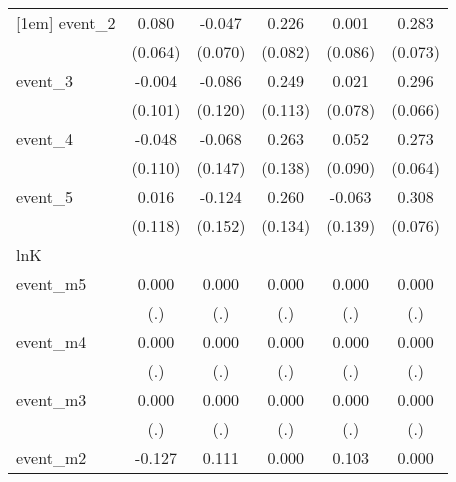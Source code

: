 {\begin{tabular}{l*{5}{c}}
[1em]
event\_2     &       0.080         &      -0.047         &       0.226\sym{**} &       0.001         &       0.283\sym{***}\\
            &     (0.064)         &     (0.070)         &     (0.082)         &     (0.086)         &     (0.073)         \\
[1em]
event\_3     &      -0.004         &      -0.086         &       0.249\sym{*}  &       0.021         &       0.296\sym{***}\\
            &     (0.101)         &     (0.120)         &     (0.113)         &     (0.078)         &     (0.066)         \\
[1em]
event\_4     &      -0.048         &      -0.068         &       0.263         &       0.052         &       0.273\sym{***}\\
            &     (0.110)         &     (0.147)         &     (0.138)         &     (0.090)         &     (0.064)         \\
[1em]
event\_5     &       0.016         &      -0.124         &       0.260         &      -0.063         &       0.308\sym{***}\\
            &     (0.118)         &     (0.152)         &     (0.134)         &     (0.139)         &     (0.076)         \\
\hline
lnK         &                     &                     &                     &                     &                     \\
event\_m5    &       0.000         &       0.000         &       0.000         &       0.000         &       0.000         \\
            &         (.)         &         (.)         &         (.)         &         (.)         &         (.)         \\
[1em]
event\_m4    &       0.000         &       0.000         &       0.000         &       0.000         &       0.000         \\
            &         (.)         &         (.)         &         (.)         &         (.)         &         (.)         \\
[1em]
event\_m3    &       0.000         &       0.000         &       0.000         &       0.000         &       0.000         \\
            &         (.)         &         (.)         &         (.)         &         (.)         &         (.)         \\
[1em]
event\_m2    &      -0.127         &       0.111         &       0.000         &       0.103         &       0.000         \\

\end{tabular}}
